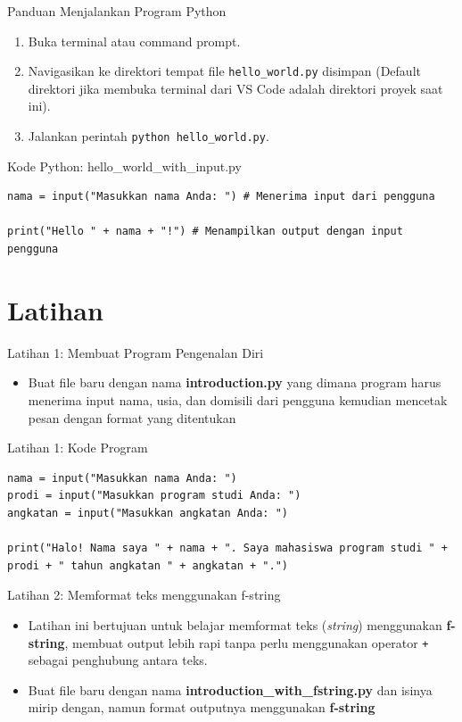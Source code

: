 \documentclass[aspectratio=169, table]{beamer}
\begin{document}
\begin{frame}[fragile]{\LARGE{Panduan Menjalankan Program Python}}
\begin{enumerate}
\item Buka terminal atau command prompt.
\item Navigasikan ke direktori tempat file \texttt{hello_world.py} disimpan (Default direktori jika membuka terminal dari VS Code adalah direktori proyek saat ini). 
\item Jalankan perintah \texttt{python hello_world.py}.
\end{enumerate}
\end{frame}

\begin{frame}[fragile]{Kode Python: hello_world_with_input.py}
\begin{lstlisting}[style=PythonStyle]
nama = input("Masukkan nama Anda: ") # Menerima input dari pengguna

print("Hello " + nama + "!") # Menampilkan output dengan input pengguna
\end{lstlisting}
\end{frame}

\section{Latihan}
\begin{frame}[fragile]{Latihan 1: Membuat Program Pengenalan Diri}
\begin{itemize}
\item Buat file baru dengan nama \textbf{introduction.py} yang dimana program harus menerima input nama, usia, dan domisili dari pengguna kemudian mencetak pesan dengan format yang ditentukan
\end{itemize}
\end{frame}

\begin{frame}[fragile]{Latihan 1: Kode Program}
\begin{lstlisting}[style=PythonStyle]
nama = input("Masukkan nama Anda: ")
prodi = input("Masukkan program studi Anda: ")
angkatan = input("Masukkan angkatan Anda: ")

print("Halo! Nama saya " + nama + ". Saya mahasiswa program studi " + prodi + " tahun angkatan " + angkatan + ".")
\end{lstlisting}
\end{frame}

\begin{frame}[fragile]{\LARGE{Latihan 2: Memformat teks menggunakan f-string}}
\begin{itemize}
\item Latihan ini bertujuan untuk belajar memformat teks (\textit{string}) menggunakan \textbf{f-string}, membuat output lebih rapi tanpa perlu menggunakan operator \texttt{+} sebagai penghubung antara teks. 
\item Buat file baru dengan nama \textbf{introduction_with_fstring.py} dan isinya mirip dengan, namun format outputnya menggunakan \textbf{f-string}
\end{itemize}
\end{frame}
\end{document}
